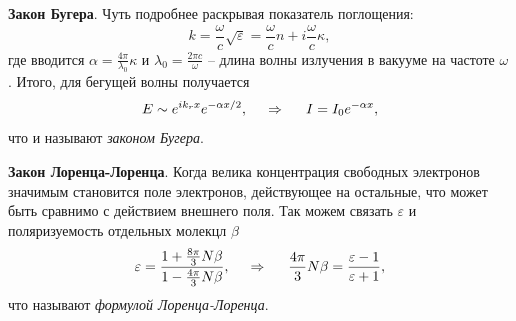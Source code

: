 \textbf{Закон Бугера}. Чуть подробнее раскрывая показатель поглощения:
\begin{equation*}
    k = \frac{\omega}{c} \sqrt{\varepsilon} = \frac{\omega}{c} n + i \frac{\omega}{c}\kappa,
\end{equation*}
где вводится $\alpha = \frac{4\pi}{\lambda_0} \kappa$ и $\lambda_0 = \frac{2 \pi c}{\omega}$ -- длина волны излучения в вакууме на частоте $\omega$. Итого, для бегущей волны получается
\begin{equation*}
    E \sim e^{ik_r x} e^{- \alpha x/2},
    \hspace{0.5cm} \Rightarrow \hspace{0.5cm}
    I = I_0 e^{- \alpha x},
\end{equation*}
что и называют \textit{законом Бугера}. 





\textbf{Закон Лоренца-Лоренца}. Когда велика концентрация свободных электронов значимым становится поле электронов, действующее на остальные, что может быть сравнимо с действием внешнего поля. Так можем связать $\varepsilon$ и поляризуемость отдельных молекцл $\beta$ 
\begin{equation*}
    \varepsilon = \frac{1 + \frac{8\pi}{3} N \beta}{1 - \frac{4\pi}{3} N \beta},
    \hspace{0.5cm} \Rightarrow \hspace{0.5cm}   
    \frac{4 \pi}{3} N \beta = \frac{\varepsilon-1}{\varepsilon+1},
\end{equation*}
что называют \textit{формулой Лоренца-Лоренца}. 



